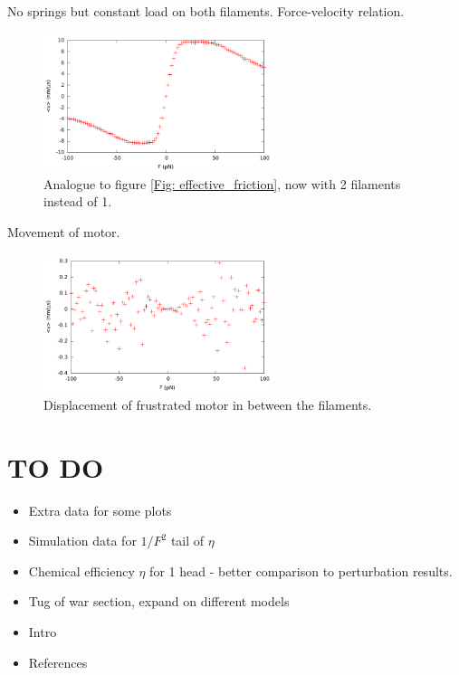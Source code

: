 \documentclass[aps,pre,onecolumn,showpacs,showkeys,a4paper]{revtex4}
\begin{document}
No springs but constant load on both filaments.\newline
Force-velocity relation.\newline
\begin{figure}[h]
\centering
\includegraphics[width=0.6\textwidth,height=!]{tug_F}
\caption{Analogue to figure \ref{Fig: effective_friction}, now with 2 filaments instead of 1.}
\label{Fig: tug_F}
\end{figure}
Movement of motor.
\begin{figure}[h]
\centering
\includegraphics[width=0.6\textwidth,height=!]{tug_F_motor}
\caption{Displacement of frustrated motor in between the filaments.}
\label{Fig: tug_F_motor}
\end{figure}

\newpage
\section{TO DO}
\begin{itemize}
\item Extra data for some plots
\item Simulation data for $1/F^2$ tail of $\eta$
\item Chemical efficiency $\eta$ for 1 head - better comparison to perturbation results.
\item Tug of war section, expand on different models
\item Intro
\item References
\end{itemize}



\end{document}

